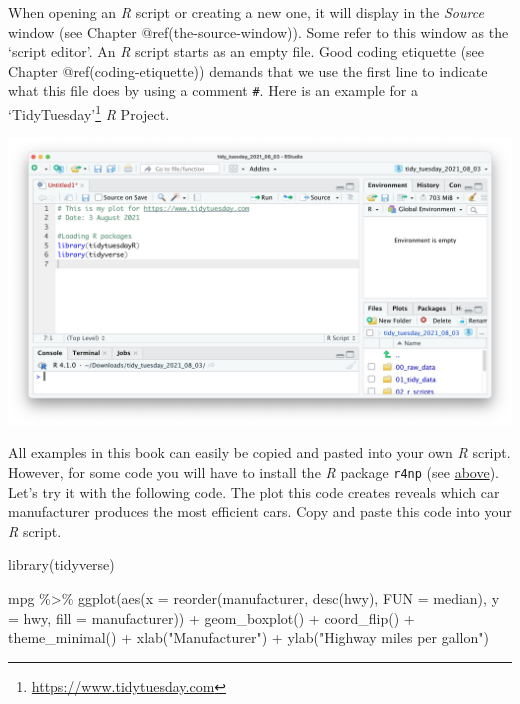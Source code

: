 \documentclass[
  letterpaper,
]{krantz}
\makeatletter
\newenvironment{Shaded}{\begin{snugshade}}{\end{snugshade}}
\newcommand{\AttributeTok}[1]{\textcolor[rgb]{0.40,0.45,0.13}{#1}}
\newcommand{\FunctionTok}[1]{\textcolor[rgb]{0.28,0.35,0.67}{#1}}
\newcommand{\NormalTok}[1]{\textcolor[rgb]{0.00,0.23,0.31}{#1}}
\newcommand{\SpecialCharTok}[1]{\textcolor[rgb]{0.37,0.37,0.37}{#1}}
\newcommand{\StringTok}[1]{\textcolor[rgb]{0.13,0.47,0.30}{#1}}
\renewcommand{\href}[2]{#2\footnote{\url{#1}}}
\newenvironment{kframe}{%
\medskip{}
\setlength{\fboxsep}{.8em}
 \def\at@end@of@kframe{}%
 \ifinner\ifhmode%
  \def\at@end@of@kframe{\end{minipage}}%
  \begin{minipage}{\columnwidth}%
 \fi\fi%
 \def\FrameCommand##1{\hskip\@totalleftmargin \hskip-\fboxsep
 \colorbox{shadecolor}{##1}\hskip-\fboxsep
     \hskip-\linewidth \hskip-\@totalleftmargin \hskip\columnwidth}%
 \MakeFramed {\advance\hsize-\width
   \@totalleftmargin\z@ \linewidth\hsize
   \@setminipage}}%
 {\par\unskip\endMakeFramed%
 \at@end@of@kframe}
\renewenvironment{Shaded}{\begin{kframe}}{\end{kframe}}
\makeatother
\begin{document}
When opening an \emph{R} script or creating a new one, it will display
in the \emph{Source} window (see Chapter @ref(the-source-window)). Some
refer to this window as the `script editor'. An \emph{R} script starts
as an empty file. Good coding etiquette (see Chapter
@ref(coding-etiquette)) demands that we use the first line to indicate
what this file does by using a comment \texttt{\#}. Here is an example
for a \href{https://www.tidytuesday.com}{`TidyTuesday'} \emph{R}
Project.

\includegraphics{images/chapter_06_img/02_r_script/00_r_script.png}

All examples in this book can easily be copied and pasted into your own
\emph{R} script. However, for some code you will have to install the
\emph{R} package \texttt{r4np} (see \hyperref[install_r4np]{above}).
Let's try it with the following code. The plot this code creates reveals
which car manufacturer produces the most efficient cars. Copy and paste
this code into your \emph{R} script.

\begin{Shaded}
\begin{Highlighting}[]
\FunctionTok{library}\NormalTok{(tidyverse)}

\NormalTok{mpg }\SpecialCharTok{\%\textgreater{}\%} \FunctionTok{ggplot}\NormalTok{(}\FunctionTok{aes}\NormalTok{(}\AttributeTok{x =} \FunctionTok{reorder}\NormalTok{(manufacturer, }\FunctionTok{desc}\NormalTok{(hwy), }\AttributeTok{FUN =}\NormalTok{ median),}
                   \AttributeTok{y =}\NormalTok{ hwy,}
                   \AttributeTok{fill =}\NormalTok{ manufacturer)) }\SpecialCharTok{+}
  \FunctionTok{geom\_boxplot}\NormalTok{() }\SpecialCharTok{+}
  \FunctionTok{coord\_flip}\NormalTok{() }\SpecialCharTok{+}
  \FunctionTok{theme\_minimal}\NormalTok{() }\SpecialCharTok{+}
  \FunctionTok{xlab}\NormalTok{(}\StringTok{"Manufacturer"}\NormalTok{) }\SpecialCharTok{+}
  \FunctionTok{ylab}\NormalTok{(}\StringTok{"Highway miles per gallon"}\NormalTok{)}
\end{Highlighting}
\end{Shaded}
\end{document}
